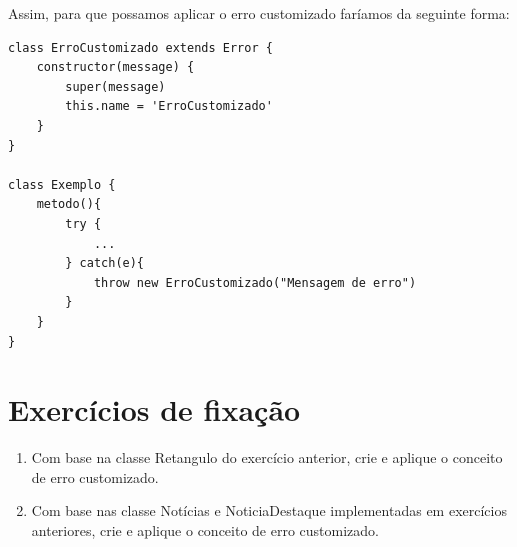 Assim, para que possamos aplicar o erro customizado faríamos da seguinte forma: 

\begin{verbatim}
class ErroCustomizado extends Error {
	constructor(message) {
		super(message)
		this.name = 'ErroCustomizado'
	}
}

class Exemplo {
	metodo(){
		try {
			...	
		} catch(e){
			throw new ErroCustomizado("Mensagem de erro")	
		}
	}
}
\end{verbatim}

\section{Exercícios de fixação}

\begin{enumerate}
	\item Com base na classe Retangulo do exercício anterior, crie e aplique o conceito de erro customizado.
	\item Com base nas classe Notícias e NoticiaDestaque implementadas em exercícios anteriores, crie e aplique o conceito de erro customizado.
\end{enumerate}

